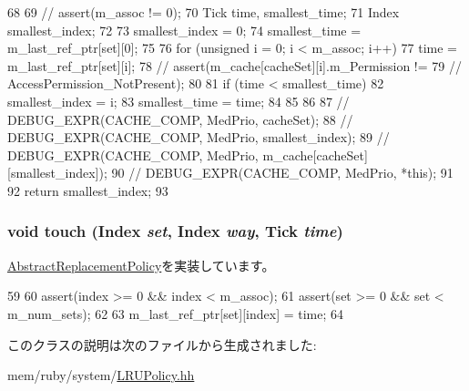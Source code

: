 \begin{DoxyCode}
68 {
69     //  assert(m_assoc != 0);
70     Tick time, smallest_time;
71     Index smallest_index;
72 
73     smallest_index = 0;
74     smallest_time = m_last_ref_ptr[set][0];
75 
76     for (unsigned i = 0; i < m_assoc; i++) {
77         time = m_last_ref_ptr[set][i];
78         // assert(m_cache[cacheSet][i].m_Permission !=
79         //     AccessPermission_NotPresent);
80 
81         if (time < smallest_time) {
82             smallest_index = i;
83             smallest_time = time;
84         }
85     }
86 
87     //  DEBUG_EXPR(CACHE_COMP, MedPrio, cacheSet);
88     //  DEBUG_EXPR(CACHE_COMP, MedPrio, smallest_index);
89     //  DEBUG_EXPR(CACHE_COMP, MedPrio, m_cache[cacheSet][smallest_index]);
90     //  DEBUG_EXPR(CACHE_COMP, MedPrio, *this);
91 
92     return smallest_index;
93 }
\end{DoxyCode}
\hypertarget{classLRUPolicy_a6d3ff52feacdaba90c7c0bfbe9f7f58a}{
\subsubsection[{touch}]{\setlength{\rightskip}{0pt plus 5cm}void touch ({\bf Index} {\em set}, \/  {\bf Index} {\em way}, \/  {\bf Tick} {\em time})}}
\label{classLRUPolicy_a6d3ff52feacdaba90c7c0bfbe9f7f58a}


\hyperlink{classAbstractReplacementPolicy_a6354174153ace07b8cef20f36b20357a}{AbstractReplacementPolicy}を実装しています。


\begin{DoxyCode}
59 {
60     assert(index >= 0 && index < m_assoc);
61     assert(set >= 0 && set < m_num_sets);
62 
63     m_last_ref_ptr[set][index] = time;
64 }
\end{DoxyCode}


このクラスの説明は次のファイルから生成されました:\begin{DoxyCompactItemize}
\item 
mem/ruby/system/\hyperlink{LRUPolicy_8hh}{LRUPolicy.hh}\end{DoxyCompactItemize}
